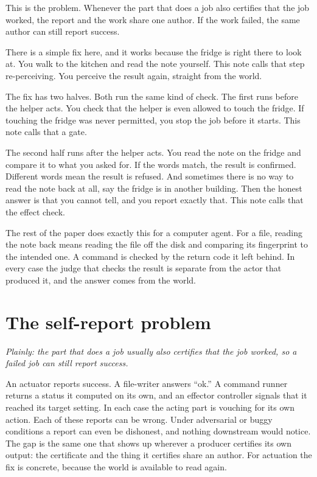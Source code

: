 \documentclass[11pt]{article}
\begin{document}
This is the problem. Whenever the part that does a job also certifies that the job worked, the report and the work share one author. If the work failed, the same author can still report success.

There is a simple fix here, and it works because the fridge is right there to look at. You walk to the kitchen and read the note yourself. This note calls that step re-perceiving. You perceive the result again, straight from the world.

The fix has two halves. Both run the same kind of check. The first runs before the helper acts. You check that the helper is even allowed to touch the fridge. If touching the fridge was never permitted, you stop the job before it starts. This note calls that a gate.

The second half runs after the helper acts. You read the note on the fridge and compare it to what you asked for. If the words match, the result is confirmed. Different words mean the result is refused. And sometimes there is no way to read the note back at all, say the fridge is in another building. Then the honest answer is that you cannot tell, and you report exactly that. This note calls that the effect check.

The rest of the paper does exactly this for a computer agent. For a file, reading the note back means reading the file off the disk and comparing its fingerprint to the intended one. A command is checked by the return code it left behind. In every case the judge that checks the result is separate from the actor that produced it, and the answer comes from the world.

\section{The self-report problem}
\emph{Plainly: the part that does a job usually also certifies that the job worked, so a failed job can still report success.}

An actuator reports success. A file-writer answers ``ok.'' A command runner returns a status it computed on its own, and an effector controller signals that it reached its target setting. In each case the acting part is vouching for its own action. Each of these reports can be wrong. Under adversarial or buggy conditions a report can even be dishonest, and nothing downstream would notice. The gap is the same one that shows up wherever a producer certifies its own output: the certificate and the thing it certifies share an author. For actuation the fix is concrete, because the world is available to read again.
\end{document}
